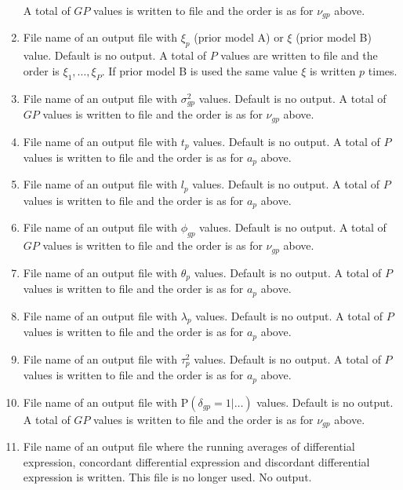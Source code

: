 \documentclass[11pt]{article}
\begin{document}
\begin{enumerate}
A total of $GP$ values is written to file and the order is as for $\nu_{gp}$ above.
\item File name of an output file with $\xi_p$  (prior model A) or $\xi$ (prior model B) value. Default is no output.
A total of $P$ values are written to file and the order is $\xi_1,\ldots,\xi_P$. If prior model
B is used the same value $\xi$ is written $p$ times.
\item File name of an output file with $\sigma^2_{gp}$ values. Default is no output.
A total of $GP$ values is written to file and the order is as for $\nu_{gp}$ above.
\item File name of an output file with $t_p$ values. Default is no output.
A total of $P$ values is written to file and the order is as for $a_p$ above.
\item File name of an output file with $l_p$ values. Default is no output.
A total of $P$ values is written to file and the order is as for $a_p$ above.
\item File name of an output file with $\phi_{gp}$ values. Default is no output.
A total of $GP$ values is written to file and the order is as for $\nu_{gp}$ above.
\item File name of an output file with $\theta_p$ values. Default is no output.
A total of $P$ values is written to file and the order is as for $a_p$ above.
\item File name of an output file with $\lambda_p$ values. Default is no output.
A total of $P$ values is written to file and the order is as for $a_p$ above.
\item File name of an output file with $\tau^2_p$ values. Default is no output.
A total of $P$ values is written to file and the order is as for $a_p$ above.

\item File name of an output file with $\mbox{P}(\delta_{gp}=1|\ldots)$ values.
Default is no output. A total of $GP$ values is written to file and the order
is as for $\nu_{gp}$ above.
\item File name of an output file where the running averages of differential expression, concordant
differential expression and discordant differential expression is written. This file is 
no longer used. No output.
\end{enumerate}
\end{document}
